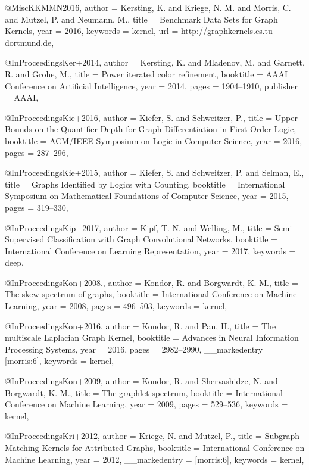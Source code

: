 @Misc{KKMMN2016,
  author   = {Kersting, K. and Kriege, N. M. and Morris, C. and Mutzel, P. and Neumann, M.},
  title    = {Benchmark Data Sets for Graph Kernels},
  year     = {2016},
  keywords = {kernel},
  url      = {http://graphkernels.cs.tu-dortmund.de},
}

@InProceedings{Ker+2014,
  author    = {Kersting, K. and Mladenov, M. and Garnett, R. and Grohe, M.},
  title     = {Power iterated color refinement},
  booktitle = {AAAI Conference on Artificial Intelligence},
  year      = {2014},
  pages     = {1904--1910},
  publisher = {AAAI},
}

@InProceedings{Kie+2016,
  author    = {Kiefer, S. and Schweitzer, P.},
  title     = {Upper Bounds on the Quantifier Depth for Graph Differentiation in First Order Logic},
  booktitle = {{ACM/IEEE} Symposium on Logic in Computer Science},
  year      = {2016},
  pages     = {287--296},
}

@InProceedings{Kie+2015,
  author    = {Kiefer, S. and Schweitzer, P. and Selman, E.},
  title     = {Graphs Identified by Logics with Counting},
  booktitle = {International Symposium on Mathematical Foundations of Computer Science},
  year      = {2015},
  pages     = {319--330},
}

@InProceedings{Kip+2017,
  author    = {Kipf, T. N. and Welling, M.},
  title     = {Semi-Supervised Classification with Graph Convolutional Networks},
  booktitle = {International Conference on Learning Representation},
  year      = {2017},
  keywords  = {deep},
}

@InProceedings{Kon+2008.,
  author    = {Kondor, R. and Borgwardt, K. M.},
  title     = {The skew spectrum of graphs},
  booktitle = {International Conference on Machine Learning},
  year      = {2008},
  pages     = {496--503},
  keywords  = {kernel},
}

@InProceedings{Kon+2016,
  author        = {Kondor, R. and Pan, H.},
  title         = {The multiscale {L}aplacian Graph Kernel},
  booktitle     = {Advances in Neural Information Processing Systems},
  year          = {2016},
  pages         = {2982--2990},
  __markedentry = {[morris:6]},
  keywords      = {kernel},
}

@InProceedings{Kon+2009,
  author    = {Kondor, R. and Shervashidze, N. and Borgwardt, K. M.},
  title     = {The graphlet spectrum},
  booktitle = {International Conference on Machine Learning},
  year      = {2009},
  pages     = {529--536},
  keywords  = {kernel},
}

@InProceedings{Kri+2012,
  author        = {Kriege, N. and Mutzel, P.},
  title         = {Subgraph Matching Kernels for Attributed Graphs},
  booktitle     = {International Conference on Machine Learning},
  year          = {2012},
  __markedentry = {[morris:6]},
  keywords      = {kernel},
}

